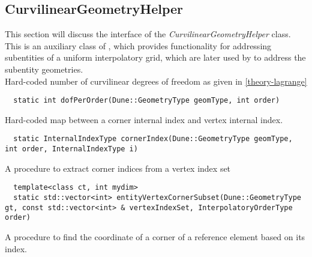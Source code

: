 \subsection{CurvilinearGeometryHelper}
\label{interface-geometry-helper}

\noindent
This section will discuss the interface of the \textit{CurvilinearGeometryHelper} class. This is an auxiliary class of \curvgeom{}, which provides functionality for addressing subentities of a uniform interpolatory grid, which are later used by \curvgeom{} to address the subentity geometries. \\


\noindent
Hard-coded number of curvilinear degrees of freedom as given in \ref{theory-lagrange} \\

\begin{mybox}
\begin{lstlisting}
  static int dofPerOrder(Dune::GeometryType geomType, int order)
\end{lstlisting}
\end{mybox}

\noindent
Hard-coded map between a corner internal index and vertex internal index. \\

\begin{mybox}
\begin{lstlisting}
  static InternalIndexType cornerIndex(Dune::GeometryType geomType, int order, InternalIndexType i)
\end{lstlisting}
\end{mybox}

\noindent
A procedure to extract corner indices from a vertex index set \\ %

\begin{mybox}
\begin{lstlisting}
  template<class ct, int mydim>
  static std::vector<int> entityVertexCornerSubset(Dune::GeometryType gt, const std::vector<int> & vertexIndexSet, InterpolatoryOrderType order)
\end{lstlisting}
\end{mybox}

\noindent
A procedure to find the coordinate of a corner of a reference element based on its index. \\ %


